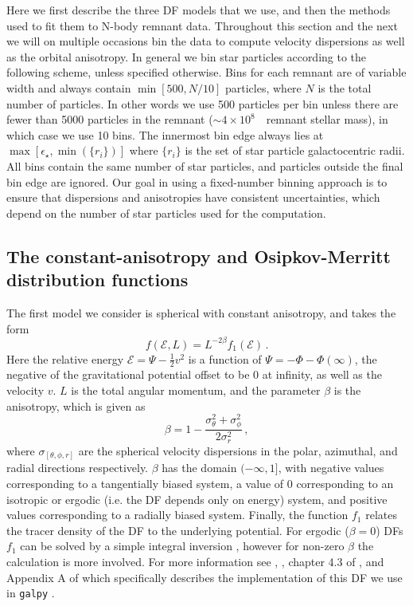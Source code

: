 Here we first describe the three DF models that we use, and then the methods used to fit them to N-body remnant data. Throughout this section and the next we will on multiple occasions bin the data to compute velocity dispersions as well as the orbital anisotropy. In general we bin star particles according to the following scheme, unless specified otherwise. Bins for each remnant are of variable width and always contain $\min[500,N/10]$ particles, where $N$ is the total number of particles. In other words we use 500 particles per bin unless there are fewer than 5000 particles in the remnant ($\sim 4\times10^{8}$~\Msun\ remnant stellar mass), in which case we use 10 bins. The innermost bin edge always lies at $\max[\epsilon_{\star},\min(\{ r_{i} \})]$ where $\{r_{i}\}$ is the set of star particle galactocentric radii. All bins contain the same number of star particles, and particles outside the final bin edge are ignored. Our goal in using a fixed-number binning approach is to ensure that dispersions and anisotropies have consistent uncertainties, which depend on the number of star particles used for the computation.

\subsection{The constant-anisotropy and Osipkov-Merritt distribution functions}
\label{ch4:subsec:distribution-function-models}

The first model we consider is spherical with constant anisotropy, and takes the form
\begin{equation}
    \label{ch4:eq:constant-anisotropy-df}
    f(\mathcal{E},L) = L^{-2\beta} f_{1}(\mathcal{E})\,.
\end{equation}
\noindent Here the relative energy $\mathcal{E} = \Psi - \frac{1}{2}v^{2}$ is a function of $\Psi = -\Phi-\Phi(\infty)$, the negative of the gravitational potential offset to be 0 at infinity, as well as the velocity $v$. $L$ is the total angular momentum, and the parameter $\beta$ is the anisotropy, which is given as
\begin{equation}
    \label{ch4:eq:beta}
    \beta = 1- \frac{\sigma^{2}_{\theta} + \sigma^{2}_{\phi}}{2\sigma^{2}_{r}}\,,
\end{equation}
\noindent where $\sigma_{[\theta,\phi,r]}$ are the spherical velocity dispersions in the polar, azimuthal, and radial directions respectively. $\beta$ has the domain $(-\infty,1]$, with negative values corresponding to a tangentially biased system, a value of 0 corresponding to an isotropic or ergodic (i.e. the DF depends only on energy) system, and positive values corresponding to a radially biased system. Finally, the function $f_{1}$ relates the tracer density of the DF to the underlying potential. For ergodic ($\beta=0$) DFs $f_{1}$ can be solved by a simple integral inversion \parencite{eddington16}, however for non-zero $\beta$ the calculation is more involved. For more information see \textcite{cuddeford91}, \textcite{an06}, chapter 4.3 of \textcite{binney08}, and Appendix A of \textcite{lane22} which specifically describes the implementation of this DF we use in \texttt{galpy} \parencite{bovy15}.

